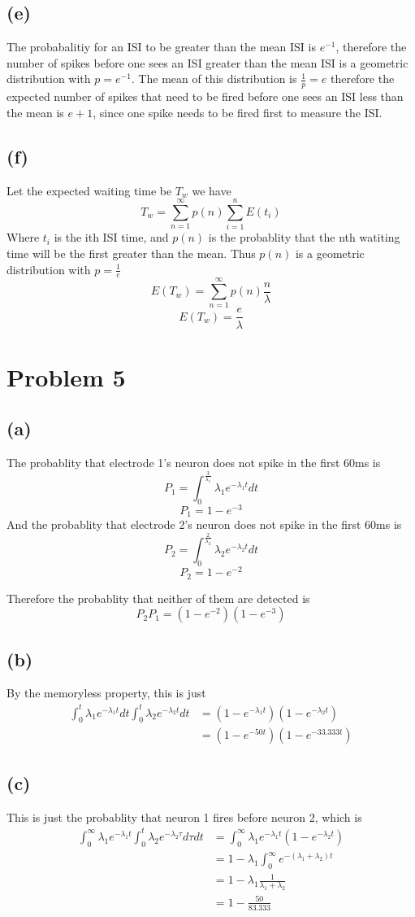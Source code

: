 \documentclass[12pt]{article}
\begin{document}
\subsection*{(e)}
The probabalitiy for an ISI to be greater than the mean ISI is $e^{-1}$, therefore the 
number of spikes before one sees an ISI greater than the mean ISI is a geometric distribution
with $p=e^{-1}$. The mean of this distribution is $\frac{1}{p}=e$ therefore the expected number of spikes
that need to be fired before one sees an ISI less than the mean is $\boxed{e+1}$, since one spike needs to be fired first to measure the ISI.
\subsection*{(f)}
Let the expected waiting time be $T_w$ we have
$$T_w=\sum_{n=1}^\infty p(n) \sum_{i=1}^{n}E(t_i)$$
Where $t_i$ is the ith ISI time, and $p(n)$ is the probablity that the nth watiting time will be the
first greater than the mean. Thus $p(n)$ is a geometric distribution with $p=\frac{1}{e}$
$$E(T_w)=\sum_{n=1}^{\infty} p(n)\frac{n}{\lambda}$$
$$E(T_w)=\boxed{\frac{e}{\lambda}}$$
\section*{Problem 5}
\subsection*{(a)}
The probablity that electrode 1's neuron does not spike in the first 60ms is 
$$P_{1}=\int_{0}^{\frac{3}{\lambda_1}}\lambda_1 e^{-\lambda_1 t}dt$$
$$P_{1}=1-e^{-3}$$
And the probablity that electrode 2's neuron does not spike in the first 60ms is 
$$P_{2}=\int_{0}^{\frac{2}{\lambda_2}}\lambda_2 e^{-\lambda_2 t}dt$$
$$P_{2}=1-e^{-2}$$

Therefore the probablity that neither of them are detected is 
$$P_{2}P_{1}=(1-e^{-2})(1-e^{-3})$$
\subsection*{(b)}
By the memoryless property, this is just
\begin{align*}
    \int_{0}^{t}\lambda_1 e^{-\lambda_1 t}dt\int_{0}^{t}\lambda_2 e^{-\lambda_2 t}dt
    &=(1-e^{-\lambda_1t})(1-e^{-\lambda_2t})\\
    &=\boxed{(1-e^{-50t})(1-e^{-33.333t})}
\end{align*}
\subsection*{(c)}
This is just the probablity that neuron 1 fires before
neuron 2, which is 
\begin{align*}
    \int_{0}^{\infty}\lambda_1e^{-\lambda_1 t}\int_{0}^{t}\lambda_2e^{-\lambda_2 \tau}d\tau dt
    &=\int_{0}^{\infty}\lambda_1e^{-\lambda_1 t}(1-e^{-\lambda_2 t})\\
    &=1-\lambda_1\int_{0}^{\infty}e^{-(\lambda_1+\lambda_2) t}\\
    &=1-\lambda_1\frac{1}{\lambda_1+\lambda_2}\\
    &=\boxed{1-\frac{50}{83.333}}
\end{align*}
\end{document}
